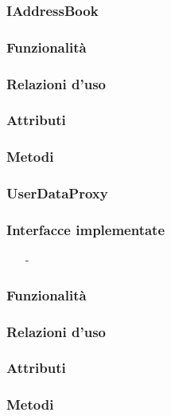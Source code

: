 \subsubsection{IAddressBook}\label{sec:iaddressbook}

\subsubsection*{Funzionalità}

\subsubsection*{Relazioni d'uso}

\subsubsection*{Attributi}

\subsubsection*{Metodi}

\subsubsection{UserDataProxy}\label{sec:userdataproxy}

\subsubsection*{Interfacce implementate}
\begin{itemize}[noitemsep,nolistsep]
  \item[-]
\end{itemize}

\subsubsection*{Funzionalità}

\subsubsection*{Relazioni d'uso}

\subsubsection*{Attributi}

\subsubsection*{Metodi}

